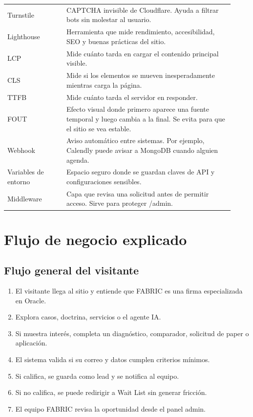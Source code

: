 \documentclass[11pt,letterpaper]{article}
\begin{document}
\begin{longtable}{p{0.24\linewidth}p{0.68\linewidth}}
Turnstile & CAPTCHA invisible de Cloudflare. Ayuda a filtrar bots sin molestar al usuario. \\
Lighthouse & Herramienta que mide rendimiento, accesibilidad, SEO y buenas pr\'acticas del sitio. \\
LCP & Mide cu\'anto tarda en cargar el contenido principal visible. \\
CLS & Mide si los elementos se mueven inesperadamente mientras carga la p\'agina. \\
TTFB & Mide cu\'anto tarda el servidor en responder. \\
FOUT & Efecto visual donde primero aparece una fuente temporal y luego cambia a la final. Se evita para que el sitio se vea estable. \\
Webhook & Aviso autom\'atico entre sistemas. Por ejemplo, Calendly puede avisar a MongoDB cuando alguien agenda. \\
Variables de entorno & Espacio seguro donde se guardan claves de API y configuraciones sensibles. \\
Middleware & Capa que revisa una solicitud antes de permitir acceso. Sirve para proteger /admin. \\
\bottomrule
\end{longtable}

\section{Flujo de negocio explicado}

\subsection{Flujo general del visitante}

\begin{enumerate}
\item El visitante llega al sitio y entiende que FABRIC es una firma especializada en Oracle.
\item Explora casos, doctrina, servicios o el agente IA.
\item Si muestra inter\'es, completa un diagn\'ostico, comparador, solicitud de paper o aplicaci\'on.
\item El sistema valida si su correo y datos cumplen criterios m\'inimos.
\item Si califica, se guarda como lead y se notifica al equipo.
\item Si no califica, se puede redirigir a Wait List sin generar fricci\'on.
\item El equipo FABRIC revisa la oportunidad desde el panel admin.
\end{enumerate}
\end{document}
